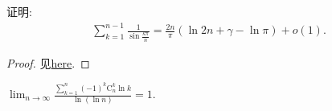 \documentclass[../../main.tex]{subfiles}%
\begin{document}
\begin{example}
证明:
\begin{align*}
\sum\limits_{k=1}^{n-1}{\frac{1}{\sin \frac{k\pi}{n}}}=\frac{2n}{\pi}\left( \ln 2n+\gamma -\ln \pi \right) +o\left( 1 \right).
\end{align*}
\end{example}
\begin{proof}
见\href{https://math.stackexchange.com/questions/3216414/sum-of-reciprocal-sine-function-sum-limits-k-1n-1-frac1-sin-frack-p?noredirect=1}{here}.
\end{proof}

\begin{example}
$\lim_{n\rightarrow \infty} \frac{\sum\limits_{k=1}^n{\left( -1 \right) ^k\mathrm{C}_{n}^{k}\ln k}}{\ln \left( \ln n \right)}=1.$
\end{example}
\end{document}
